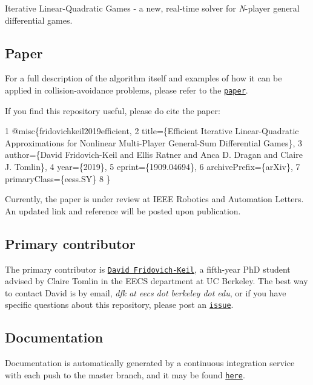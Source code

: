  

Iterative Linear-\/\+Quadratic Games -\/ a new, real-\/time solver for {\itshape N}-\/player general differential games.

\subsection*{Paper}

For a full description of the algorithm itself and examples of how it can be applied in collision-\/avoidance problems, please refer to the \href{https://arxiv.org/abs/1909.04694}{\tt paper}.

If you find this repository useful, please do cite the paper\+: 
\begin{DoxyCode}
1 @misc\{fridovichkeil2019efficient,
2     title=\{Efficient Iterative Linear-Quadratic Approximations for Nonlinear Multi-Player General-Sum
       Differential Games\},
3     author=\{David Fridovich-Keil and Ellis Ratner and Anca D. Dragan and Claire J. Tomlin\},
4     year=\{2019\},
5     eprint=\{1909.04694\},
6     archivePrefix=\{arXiv\},
7     primaryClass=\{eess.SY\}
8 \}
\end{DoxyCode}


Currently, the paper is under review at I\+E\+EE Robotics and Automation Letters. An updated link and reference will be posted upon publication.

\subsection*{Primary contributor}

The primary contributor is \href{https://people.eecs.berkeley.edu/~dfk/}{\tt David Fridovich-\/\+Keil}, a fifth-\/year PhD student advised by Claire Tomlin in the E\+E\+CS department at UC Berkeley. The best way to contact David is by email, {\itshape dfk at eecs dot berkeley dot edu}, or if you have specific questions about this repository, please post an \href{https://github.com/HJReachability/ilqgames/issues}{\tt issue}.

\subsection*{Documentation}

Documentation is automatically generated by a continuous integration service with each push to the {\ttfamily master} branch, and it may be found \href{https://HJReachability.github.io/ilqgames/documentation/html/}{\tt here}.

